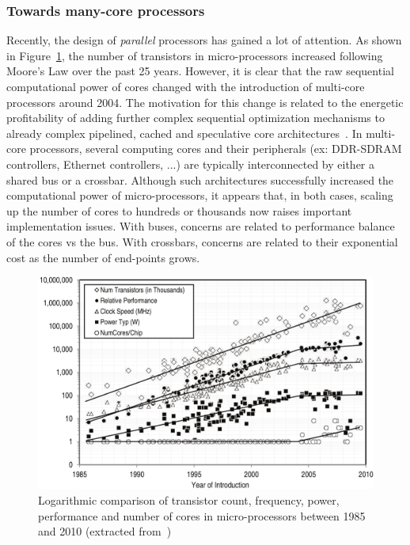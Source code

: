 \documentclass[main.tex]{subfiles}
\begin{document}
\subsubsection{Towards many-core processors}
Recently, the design of \emph{parallel} processors has gained a lot of attention. As shown in Figure~\ref{fig_intro_procPerfScaling}, the number of transistors in micro-processors increased following Moore's Law over the past 25 years. However, it is clear that the raw sequential computational power of cores changed with the introduction of multi-core processors around 2004. The motivation for this change is related to the energetic profitability of adding further complex sequential optimization mechanisms to already complex pipelined, cached and speculative core architectures~\cite{Borkar2011}. In multi-core processors, several computing cores and their peripherals (ex: DDR-SDRAM controllers, Ethernet controllers, ...) are typically interconnected by either a shared bus or a crossbar. Although such architectures successfully increased the computational power of micro-processors, it appears that, in both cases, scaling up the number of cores to hundreds or thousands now raises important implementation issues. With buses, concerns are related to performance balance of the cores vs the bus. With crossbars, concerns are related to their exponential cost as the number of end-points grows.

\begin{figure}
    \centering
    \includegraphics[width=14cm]{imgs/png/intro_procPerfScaling.png}
    \caption{Logarithmic comparison of transistor count, frequency, power, performance and number of cores in micro-processors between 1985 and 2010 (extracted from~\cite{Fuller2011})}
    \label{fig_intro_procPerfScaling}
\end{figure}
\end{document}
